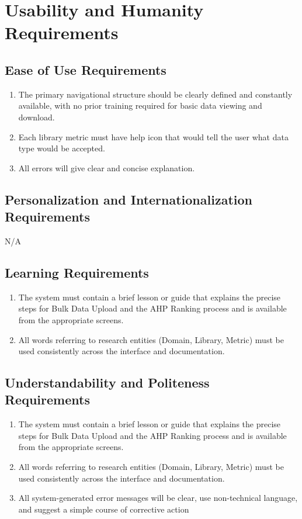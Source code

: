 \documentclass[12pt]{article}
\begin{document}
\section{Usability and Humanity Requirements}
\subsection{Ease of Use Requirements}
\begin{enumerate}[label=UH-EU\arabic*]
  \item The primary navigational structure should be clearly defined and constantly available, with no prior training required for basic data viewing and download.
  \item Each library metric must have help icon that would tell the user what data type would be accepted.
  \item All errors will give clear and concise explanation.
\end{enumerate}
\subsection{Personalization and Internationalization Requirements}
N/A
\subsection{Learning Requirements}
\begin{enumerate}[label=UH-LR\arabic*]
  \item The system must contain a brief lesson or guide that explains the precise steps for Bulk Data Upload and the AHP Ranking process and is available from the appropriate screens.
  \item All words referring to research entities (Domain, Library, Metric) must be used consistently across the interface and documentation.
\end{enumerate}
\subsection{Understandability and Politeness Requirements}
\begin{enumerate}[label=UH-UP\arabic*]
  \item The system must contain a brief lesson or guide that explains the precise steps for Bulk Data Upload and the AHP Ranking process and is available from the appropriate screens.
  \item All words referring to research entities (Domain, Library, Metric) must be used consistently across the interface and documentation.
  \item All system-generated error messages will be clear, use non-technical language, and suggest a simple course of corrective action
\end{enumerate}
\end{document}
